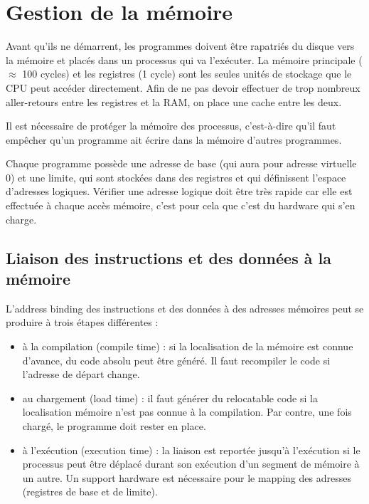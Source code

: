 \chapter{Gestion de la mémoire}

Avant qu'ils ne démarrent, les programmes doivent être rapatriés du disque vers la mémoire et placés dans un processus qui va l'exécuter. La mémoire principale ($\approx$ 100 cycles) et les registres (1 cycle) sont les seules unités de stockage que le CPU peut accéder directement. Afin de ne pas devoir effectuer de trop nombreux aller-retours entre les registres et la RAM, on place une cache entre les deux.

Il est nécessaire de protéger la mémoire des processus, c'est-à-dire qu'il faut empêcher qu'un programme ait écrire dans la mémoire d'autres programmes.

Chaque programme possède une adresse de base (qui aura pour adresse virtuelle 0) et une limite, qui sont stockées dans des registres et qui définissent l'espace d'adresses logiques. Vérifier une adresse logique doit être très rapide car elle est effectuée à chaque accès mémoire, c'est pour cela que c'est du hardware qui s'en charge.


\section{Liaison des instructions et des données à la mémoire}

L'address binding des instructions et des données à des adresses mémoires peut se produire à trois étapes différentes :

\begin{itemize}
	\item à la compilation (compile time) : si la localisation de la mémoire est connue d'avance, du code absolu peut être généré. Il faut recompiler le code si l'adresse de départ change.
	\item au chargement (load time) : il faut générer du relocatable code si la localisation mémoire n'est pas connue à la compilation. Par contre, une fois chargé, le programme doit rester en place.
	\item à l'exécution (execution time) : la liaison est reportée jusqu'à l'exécution si le processus peut être déplacé durant son exécution d'un segment de mémoire à un autre. Un support hardware est nécessaire pour le mapping des adresses (registres de base et de limite).
\end{itemize}

